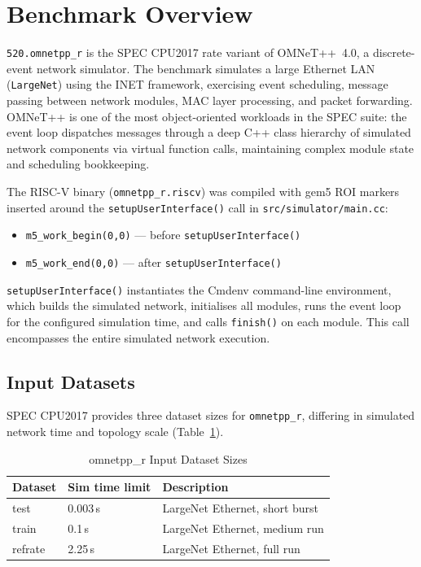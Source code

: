 \documentclass[conference]{IEEEtran}
\begin{document}
\section{Benchmark Overview}

\texttt{520.omnetpp\_r} is the SPEC CPU2017 rate variant of
OMNeT++~4.0, a discrete-event network simulator. The benchmark
simulates a large Ethernet LAN (\texttt{LargeNet}) using the INET
framework, exercising event scheduling, message passing between
network modules, MAC layer processing, and packet forwarding.
OMNeT++ is one of the most object-oriented workloads in the SPEC
suite: the event loop dispatches messages through a deep C++ class
hierarchy of simulated network components via virtual function calls,
maintaining complex module state and scheduling bookkeeping.

The RISC-V binary (\texttt{omnetpp\_r.riscv}) was compiled with gem5
ROI markers inserted around the \texttt{setupUserInterface()} call
in \texttt{src/simulator/main.cc}:

\begin{itemize}
    \item \texttt{m5\_work\_begin(0,0)} --- before \texttt{setupUserInterface()}
    \item \texttt{m5\_work\_end(0,0)}   --- after  \texttt{setupUserInterface()}
\end{itemize}

\texttt{setupUserInterface()} instantiates the Cmdenv command-line
environment, which builds the simulated network, initialises all
modules, runs the event loop for the configured simulation time,
and calls \texttt{finish()} on each module. This call encompasses
the entire simulated network execution.

\subsection{Input Datasets}

SPEC CPU2017 provides three dataset sizes for \texttt{omnetpp\_r},
differing in simulated network time and topology scale
(Table~\ref{tab:inputs}).

\begin{table}[H]
\centering
\caption{omnetpp\_r Input Dataset Sizes}
\label{tab:inputs}
\begin{tabular}{lll}
\toprule
\textbf{Dataset} & \textbf{Sim time limit} & \textbf{Description} \\
\midrule
test    & 0.003\,s & LargeNet Ethernet, short burst \\
train   & 0.1\,s   & LargeNet Ethernet, medium run \\
refrate & 2.25\,s  & LargeNet Ethernet, full run \\
\bottomrule
\end{tabular}
\end{table}
\end{document}
